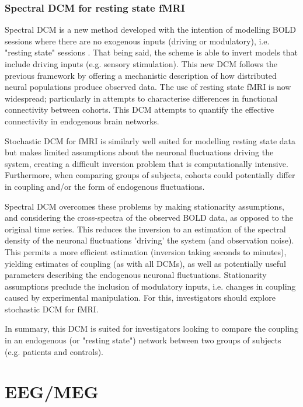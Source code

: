\documentclass[a4paper,titlepage,openany]{article}
\begin{document}
\subsubsection{Spectral DCM for resting state fMRI}

Spectral DCM is a new method developed with the intention of modelling BOLD sessions where there are no exogenous inputs (driving or modulatory), i.e. "resting state" sessions \cite{rsDCM2014}. That being said, the scheme is able to invert models that include driving inputs (e.g. sensory stimulation). This new DCM follows the previous framework by offering a mechanistic description of how distributed neural populations produce observed data. The use of resting state fMRI is now widespread; particularly in attempts to characterise differences in functional connectivity between cohorts. This DCM attempts to quantify the effective connectivity in endogenous brain networks.

Stochastic DCM for fMRI is similarly well suited for modelling resting state data but makes limited assumptions about the neuronal fluctuations driving the system, creating a difficult inversion problem that is computationally intensive. Furthermore, when comparing groups of subjects, cohorts could potentially differ in coupling and/or the form of endogenous fluctuations.

Spectral DCM overcomes these problems by making stationarity assumptions, and considering the cross-spectra of the observed BOLD data, as opposed to the original time series. This reduces the inversion to an estimation of the spectral density of the neuronal fluctuations 'driving' the system (and observation noise). This permits a more efficient estimation (inversion taking seconds to minutes), yielding estimates of coupling (as with all DCMs), as well as potentially useful parameters describing the endogenous neuronal fluctuations. Stationarity assumptions preclude the inclusion of modulatory inputs, i.e. changes in coupling caused by experimental manipulation. For this, investigators should explore stochastic DCM for fMRI.

In summary, this DCM is suited for investigators looking to compare the coupling in an endogenous (or "resting state") network between two groups of subjects (e.g. patients and controls).

\section{EEG/MEG}
\end{document}
